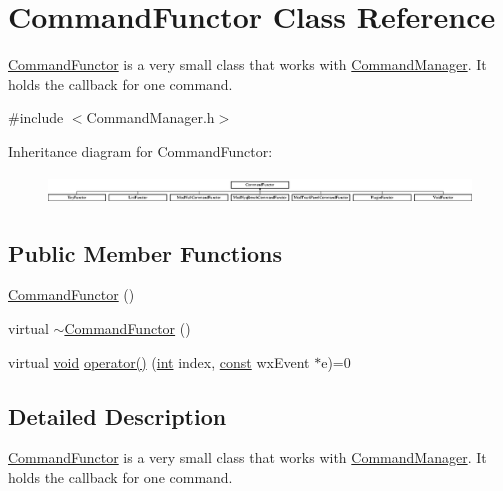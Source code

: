 \hypertarget{class_command_functor}{}\section{Command\+Functor Class Reference}
\label{class_command_functor}


\hyperlink{class_command_functor}{Command\+Functor} is a very small class that works with \hyperlink{class_command_manager}{Command\+Manager}. It holds the callback for one command.  




{\ttfamily \#include $<$Command\+Manager.\+h$>$}

Inheritance diagram for Command\+Functor\+:\begin{figure}[H]
\begin{center}
\leavevmode
\includegraphics[height=0.769231cm]{class_command_functor}
\end{center}
\end{figure}
\subsection*{Public Member Functions}
\begin{DoxyCompactItemize}
\item 
\hyperlink{class_command_functor_ad1bee1bfa119d6b35c02f8a91f6ea845}{Command\+Functor} ()
\item 
virtual \hyperlink{class_command_functor_ac7bf7c02ddd444575ef949205958805c}{$\sim$\+Command\+Functor} ()
\item 
virtual \hyperlink{sound_8c_ae35f5844602719cf66324f4de2a658b3}{void} \hyperlink{class_command_functor_aa5eb5a48a1c03402286cc7288375c741}{operator()} (\hyperlink{xmltok_8h_a5a0d4a5641ce434f1d23533f2b2e6653}{int} index, \hyperlink{getopt1_8c_a2c212835823e3c54a8ab6d95c652660e}{const} wx\+Event $\ast$e)=0
\end{DoxyCompactItemize}


\subsection{Detailed Description}
\hyperlink{class_command_functor}{Command\+Functor} is a very small class that works with \hyperlink{class_command_manager}{Command\+Manager}. It holds the callback for one command. 

